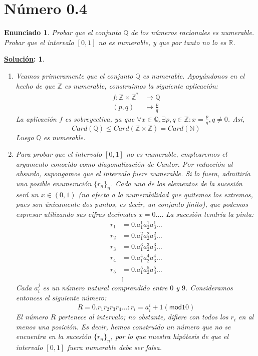 \documentclass[10pt,a4paper,openright]{book}
\theoremstyle{break}
\newtheorem*{enun}{Enunciado}
\newtheorem*{ej}{\underline{Solución}:}
\begin{document}
\section{Número 0.4}
\begin{enun}
Probar que el conjunto $\mathbb{Q}$ de los números racionales es numerable. Probar que el intervalo $[0,1]$ no es numerable, y que por tanto no lo es $\mathbb{R}$.
\end{enun}
\begin{ej}
\begin{enumerate}[label={(\arabic*)}]
\item Veamos primeramente que el conjunto $\mathbb{Q}$ es numerable. Apoyándonos en el hecho de que $\mathbb{Z}$ es numerable, construimos la siguiente aplicación: \begin{align*}
f: \mathbb{Z} \times \mathbb{Z}^* &\rightarrow \mathbb{Q} \\ 
(p,q) &\mapsto \frac{p}{q}
\end{align*}
La aplicación $f$ es sobreyectiva, ya que $\forall x \in \mathbb{Q}, \exists p,q \in \mathbb{Z} : x = \frac{p}{q}, q \neq 0$. Así, $$Card(\mathbb{Q}) \leq Card(\mathbb{Z} \times \mathbb{Z}) = Card(\mathbb{N})$$ Luego $\mathbb{Q}$ es numerable.
\item Para probar que el intervalo $[0,1]$ no es numerable, emplearemos el argumento conocido como \textit{diagonalización de Cantor}. Por reducción al absurdo, supongamos que el intervalo fuere numerable. Si lo fuera, admitiría una posible enumeración $\{r_n\}_n$. Cada uno de los elementos de la sucesión será un $x \in (0,1)$ (no afecta a la numerabilidad que quitemos los extremos, pues son únicamente dos puntos, es decir, un conjunto finito), que podemos expresar utilizando sus cifras decimales $x = 0.\ldots$ La sucesión tendría la pinta:
\begin{align*}
r_1 &= 0.a_1^1a_2^1a_3^1\ldots \\ 
r_2 &= 0.a_1^2a_2^2a_3^2\ldots \\ 
r_3 &= 0.a_1^3a_2^3a_3^3\ldots \\ 
r_4 &= 0.a_1^4a_2^4a_3^4\ldots \\ 
r_5 &= 0.a_1^5a_2^5a_3^5\ldots \\ 
&\vdots
\end{align*}
Cada $a_i^j$ es un número natural comprendido entre $0$ y $9$. Consideramos entonces el siguiente número: $$R= 0.r_1r_2r_3r_4 \ldots: r_i = a_i^i + 1 (\textsf{mod} 10)$$
El número $R$ pertenece al intervalo; no obstante, difiere con todos los $r_i$ en al menos una posición. Es decir, hemos construido un número que no se encuentra en la sucesión $\{r_n\}_n$, por lo que nuestra hipótesis de que el intervalo $[0,1]$ fuera numerable debe ser falsa.


\end{enumerate}
\end{ej}
\end{document}
